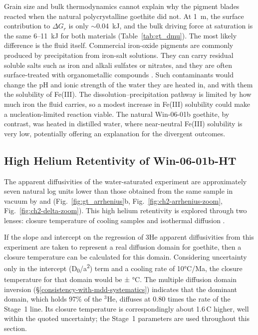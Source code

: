 Grain size and bulk thermodynamics cannot explain why the pigment blades reacted when the natural 
polycrystalline goethite did not. At 1~\textmu m, the surface contribution to $\Delta G_r$ is only
$\sim$0.04~kJ, and the bulk driving force at saturation is the same 6--11~kJ for both materials
(Table~\ref{tab:gt_dmu}). The most likely difference is the fluid itself. Commercial iron-oxide
pigments are commonly produced by precipitation from iron-salt solutions. They can carry
residual soluble salts such as iron and alkali sulfates or nitrates, and they are often surface-treated with 
organometallic compounds \citep{legodi2007,almeidasilva2017,xu2021}. Such contaminants would
change the pH and ionic strength of the water they are heated in, and with them the solubility
of Fe(III). The dissolution--precipitation pathway is limited by how much iron the fluid
carries, so a modest increase in Fe(III) solubility could make a nucleation-limited reaction
viable. The natural Win-06-01b goethite, by contrast, was heated in
distilled water, where near-neutral Fe(III) solubility is very low, potentially offering an explanation for
the divergent outcomes.


\subsection{\texorpdfstring{High Helium Retentivity of
Win-06-01b-HT}{ High Helium Retentivity of Win-06-01b-HT}}\label{high-helium-retentivity-of-win-06-01b-ht}

The apparent diffusivities of the water-saturated experiment are approximately seven natural log units lower than
those obtained from the same sample in vacuum by \citet{monteiro2017} and \citet{farley2024} (Fig.~\ref{fig:gt_arrhenius}b,
Fig.~\ref{fig:ch2-arrhenius-zoom}, Fig.~\ref{fig:ch2-delta-zoom}). This high
helium retentivity is explored through two lenses: closure temperature
of cooling samples \citep{dodson1973} and isothermal diffusion \citep{wolf1998}.

If the slope and intercept on the regression of 3He apparent
diffusivities from this experiment are taken to represent a real
diffusion domain for goethite, then a closure temperature can be
calculated for this domain. Considering uncertainty only in the
intercept (D\textsubscript{0}/a\textsuperscript{2}) term and a cooling rate of 10°C/Ma, the closure
temperature for that domain would be \ChTwoTc ± \ChTwoTcErr °C.
The multiple diffusion domain inversion (\S\ref{consistency-with-mdd-systematics}) indicates
that the dominant domain, which holds 97\% of the $^3$He, diffuses at 0.80 times the rate of
the Stage~1 line. Its closure temperature is correspondingly about 1.6\,\textdegree C higher,
well within the quoted uncertainty; the Stage~1 parameters are used throughout this section.

